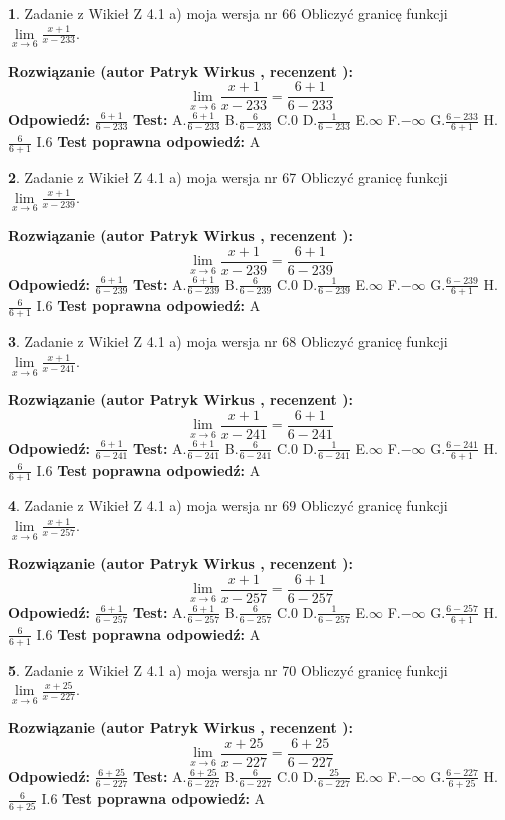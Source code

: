 \documentclass[12pt, a4paper]{article}
\theoremstyle{definition} %
\newtheorem{zad}{}
\newcommand{\zadStart}[1]{\begin{zad}#1\newline}
\newcommand{\zadStop}{\end{zad}}
\newcommand{\rozwStart}[2]{\noindent \textbf{Rozwiązanie (autor #1 , recenzent #2): }\newline}
\newcommand{\rozwStop}{\newline}
\newcommand{\odpStart}{\noindent \textbf{Odpowiedź:}\newline}
\newcommand{\odpStop}{\newline}
\newcommand{\testStart}{\noindent \textbf{Test:}\newline}
\newcommand{\testStop}{\newline}
\newcommand{\kluczStart}{\noindent \textbf{Test poprawna odpowiedź:}\newline}
\newcommand{\kluczStop}{\newline}
\begin{document}
\zadStart{Zadanie z Wikieł Z 4.1 a) moja wersja nr 66}
Obliczyć granicę funkcji $\lim\limits_{x\to6}\frac{x+1}{x-233}$.
\zadStop
\rozwStart{Patryk Wirkus}{}
$$\lim\limits_{x\to6}\frac{x+1}{x-233} = \frac{6+1}{6-233}$$
\rozwStop
\odpStart
$\frac{6+1}{6-233}$
\odpStop
\testStart
A.$\frac{6+1}{6-233}$
B.$\frac{6}{6-233}$
C.$0$
D.$\frac{1}{6-233}$
E.$\infty$
F.$-\infty$
G.$\frac{6-233}{6+1}$
H.$\frac{6}{6+1}$
I.$6$
\testStop
\kluczStart
A
\kluczStop



\zadStart{Zadanie z Wikieł Z 4.1 a) moja wersja nr 67}
Obliczyć granicę funkcji $\lim\limits_{x\to6}\frac{x+1}{x-239}$.
\zadStop
\rozwStart{Patryk Wirkus}{}
$$\lim\limits_{x\to6}\frac{x+1}{x-239} = \frac{6+1}{6-239}$$
\rozwStop
\odpStart
$\frac{6+1}{6-239}$
\odpStop
\testStart
A.$\frac{6+1}{6-239}$
B.$\frac{6}{6-239}$
C.$0$
D.$\frac{1}{6-239}$
E.$\infty$
F.$-\infty$
G.$\frac{6-239}{6+1}$
H.$\frac{6}{6+1}$
I.$6$
\testStop
\kluczStart
A
\kluczStop



\zadStart{Zadanie z Wikieł Z 4.1 a) moja wersja nr 68}
Obliczyć granicę funkcji $\lim\limits_{x\to6}\frac{x+1}{x-241}$.
\zadStop
\rozwStart{Patryk Wirkus}{}
$$\lim\limits_{x\to6}\frac{x+1}{x-241} = \frac{6+1}{6-241}$$
\rozwStop
\odpStart
$\frac{6+1}{6-241}$
\odpStop
\testStart
A.$\frac{6+1}{6-241}$
B.$\frac{6}{6-241}$
C.$0$
D.$\frac{1}{6-241}$
E.$\infty$
F.$-\infty$
G.$\frac{6-241}{6+1}$
H.$\frac{6}{6+1}$
I.$6$
\testStop
\kluczStart
A
\kluczStop



\zadStart{Zadanie z Wikieł Z 4.1 a) moja wersja nr 69}
Obliczyć granicę funkcji $\lim\limits_{x\to6}\frac{x+1}{x-257}$.
\zadStop
\rozwStart{Patryk Wirkus}{}
$$\lim\limits_{x\to6}\frac{x+1}{x-257} = \frac{6+1}{6-257}$$
\rozwStop
\odpStart
$\frac{6+1}{6-257}$
\odpStop
\testStart
A.$\frac{6+1}{6-257}$
B.$\frac{6}{6-257}$
C.$0$
D.$\frac{1}{6-257}$
E.$\infty$
F.$-\infty$
G.$\frac{6-257}{6+1}$
H.$\frac{6}{6+1}$
I.$6$
\testStop
\kluczStart
A
\kluczStop



\zadStart{Zadanie z Wikieł Z 4.1 a) moja wersja nr 70}
Obliczyć granicę funkcji $\lim\limits_{x\to6}\frac{x+25}{x-227}$.
\zadStop
\rozwStart{Patryk Wirkus}{}
$$\lim\limits_{x\to6}\frac{x+25}{x-227} = \frac{6+25}{6-227}$$
\rozwStop
\odpStart
$\frac{6+25}{6-227}$
\odpStop
\testStart
A.$\frac{6+25}{6-227}$
B.$\frac{6}{6-227}$
C.$0$
D.$\frac{25}{6-227}$
E.$\infty$
F.$-\infty$
G.$\frac{6-227}{6+25}$
H.$\frac{6}{6+25}$
I.$6$
\testStop
\kluczStart
A
\kluczStop
\end{document}
